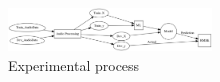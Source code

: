 \documentclass{article}
\begin{document}

 	
	\begin{figure}[h]
 		\begin{center}
		\includegraphics[width=0.48\textwidth]{process} 
  		\end{center}
  		\caption{Experimental process}
  		\label{process} 
 	\end{figure}

\end{document}
